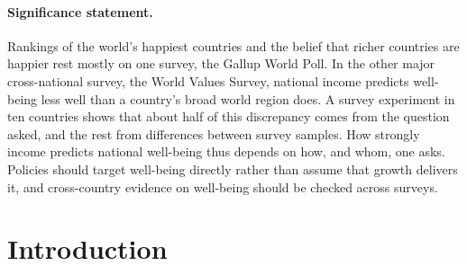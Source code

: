 \documentclass[10pt]{article}
\begin{document}
\begin{abstract}
\end{abstract}

\paragraph{Significance statement.} Rankings of the world's happiest countries and the belief that richer countries are happier rest mostly on one survey, the Gallup World Poll. In the other major cross-national survey, the World Values Survey, national income predicts well-being less well than a country's broad world region does. A survey experiment in ten countries shows that about half of this discrepancy comes from the question asked, and the rest from differences between survey samples. How strongly income predicts national well-being thus depends on how, and whom, one asks. Policies should target well-being directly rather than assume that growth delivers it, and cross-country evidence on well-being should be checked across surveys.

\section*{Introduction}
\end{document}
